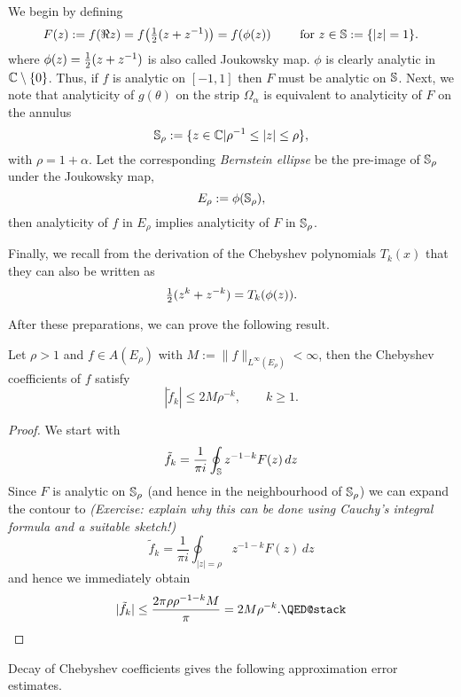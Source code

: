 We begin by defining
\[
   F(z) := f(\Re z) = f\big( {\textstyle \frac{1}{2}}(z+z^{-1}) \big)
         = f(\phi(z)) \qquad \text{ for } z \in \mathbb{S} := \{|z|=1\}.
\]
%
where $\phi(z) = {\textstyle \frac{1}{2}} (z+z^{-1})$ is also called Joukowsky map. $\phi$ is
clearly analytic in $\mathbb{C} \setminus \{0\}$. Thus, if $f$ is analytic on $[-1,1]$
then $F$ must be analytic on $\mathbb{S}$. Next, we note that analyticity of $g(\theta)$
on the strip $\Omega_\alpha$ is equivalent to analyticity of $F$ on the annulus
%
\[
   \mathbb{S}_\rho := \{ z \in \mathbb{C} | \rho^{-1} \leq |z| \leq \rho \},
\]
%
with $\rho = 1+\alpha$. Let the corresponding {\em Bernstein ellipse} be the
pre-image of $\mathbb{S}_\rho$ under the Joukowsky map,
%
\[
   E_\rho := \phi(\mathbb{S}_\rho),
\]
%
then analyticity of $f$ in $E_\rho$ implies analyticity of $F$ in $\mathbb{S}_\rho$.

Finally, we recall from the derivation of the Chebyshev polynomials $T_k(x)$
that they can also be written as
\[
   {\textstyle \frac{1}{2}} (z^k + z^{-k}) = T_k(\phi(z)).
\]

After these preparations, we can prove the following result.


\begin{theorem}
   Let $\rho > 1$ and $f \in A(E_\rho)$ with  $M := \|f\|_{L^\infty(E_\rho)} <
   \infty$, then the Chebyshev coefficients of $f$ satisfy
   \[
      |\tilde{f}_k| \leq 2 M \rho^{-k}, \qquad k \geq 1.
   \]
\end{theorem}
\begin{proof}
   We start with
   \[
      \tilde{f}_k = \frac{1}{\pi i} \oint_{\mathbb{S}} z^{-1-k} F(z) \, dz
   \]
   Since $F$ is analytic on $\mathbb{S}_\rho$ (and hence in the neighbourhood of $\mathbb{S}_\rho$)
   we can expand the contour to {\it (Exercise: explain why this can be done using
   Cauchy's integral formula and a suitable sketch!)}
   \[
      \tilde{f}_k = \frac{1}{\pi i} \oint_{|z|=\rho} z^{-1-k} F(z) \, dz
   \]
   and hence we immediately obtain
   \[
      |\tilde{f}_k| \leq \frac{2\pi \rho \rho^{-1-k} M}{\pi} = 2 M \rho^{-k}.
      \qedhere
   \]
\end{proof}

Decay of Chebyshev coefficients gives the following approximation error
estimates.


